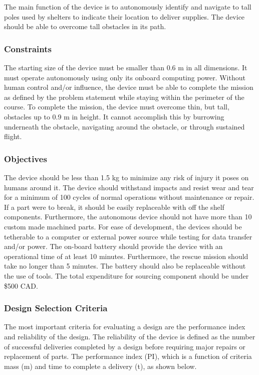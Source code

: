 \documentclass[ece]{uw-wkrpt}
\begin{document}
The main function of the device is to autonomously identify and navigate to tall poles used by shelters to indicate their location to deliver supplies. The device should be able to overcome tall obstacles in its path.

\subsubsection{Constraints}

The starting size of the device must be smaller than 0.6 m in all dimensions. It must operate autonomously using only its onboard computing power. Without human control and/or influence, the device must be able to complete the mission as defined by the problem statement while staying within the perimeter of the course. To complete the mission, the device must overcome thin, but tall, obstacles up to 0.9 m in height. It cannot accomplish this by burrowing underneath the obstacle, navigating around the obstacle, or through sustained flight.

\subsubsection{Objectives}

The device should be less than 1.5 kg to minimize any risk of injury it poses on humans around it. The device should withstand impacts and resist wear and tear for a minimum of 100 cycles of normal operations without maintenance or repair. If a part were to break, it should be easily replaceable with off the shelf components. Furthermore, the autonomous device should not have more than 10 custom made machined parts. For ease of development, the devices should be tetherable to a computer or external power source while testing for data transfer and/or power. The on-board battery should provide the device with an operational time of at least 10 minutes. Furthermore, the rescue mission should take no longer than 5 minutes. The battery should also be replaceable without the use of tools. The total expenditure for sourcing component should be under \$500 CAD. 

\subsubsection{Design Selection Criteria}

The most important criteria for evaluating a design are the performance index and reliability of the design. The reliability of the device is defined as the number of successful deliveries completed by a design before requiring major repairs or replacement of parts. The performance index (PI), which is a function of criteria mass (m) and time to complete a delivery (t), as shown below.
\end{document}
